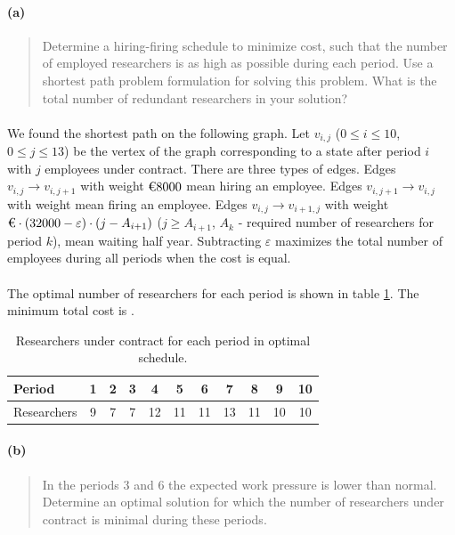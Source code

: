 \paragraph{(a)}
\begin{quote}
Determine a hiring-firing schedule to minimize cost, such that the number of employed researchers is as high as possible during each period. Use a shortest path problem formulation for solving this problem. What is the total number of redundant researchers in your solution?
\end{quote}

\paragraph{}
We found the shortest path on the following graph. Let $v_{i, j}$ ($0 \leq i \leq 10$, $0 \leq j \leq 13$) be the vertex of the graph corresponding to a state after period $i$ with $j$ employees under contract. There are three types of edges. Edges $v_{i, j} \rightarrow v_{i, j+1}$ with weight $\text{\texteuro} 8000$ mean hiring an employee. Edges $v_{i, j+1} \rightarrow v_{i, j}$ with weight  mean firing an employee. Edges $v_{i, j} \rightarrow v_{i+1, j}$ with weight $\text{\texteuro} \cdot (32000 -\varepsilon) \cdot (j - A_{i+1})$ ($j \geq A_{i+1}$, $A_k$ - required number of researchers for period $k$), mean waiting half year. Subtracting $\varepsilon$ maximizes the total number of employees during all periods when the cost is equal.

\paragraph{}
The optimal number of researchers for each period is shown in table \ref{researchers-1-3a}. The minimum total cost is .

\begin{table}[H]
\centering
\begin{tabular}{lcccccccccc}
\hline
Period & 1 & 2 & 3 & 4 & 5 & 6 & 7 & 8 & 9 & 10 \\ \hline
Researchers & 9 & 7 & 7 & 12 & 11 & 11 & 13 & 11 & 10 & 10 \\ \hline
\end{tabular}
\caption{Researchers under contract for each period in optimal schedule.}
\label{researchers-1-3a}
\end{table}

\paragraph{(b)}
\begin{quote}
In the periods 3 and 6 the expected work pressure is lower than normal. Determine an optimal solution for which the number of researchers under contract is minimal during these periods.
\end{quote}

